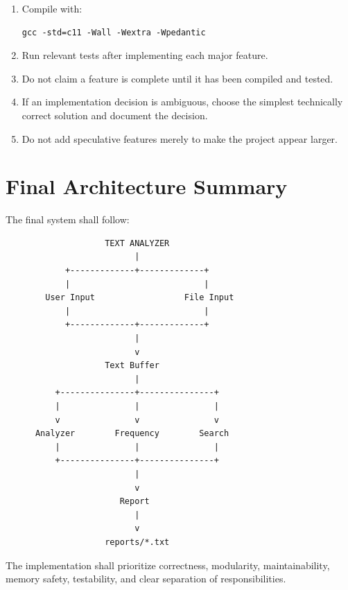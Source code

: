 \documentclass[12pt,a4paper]{article}
\begin{document}
\begin{enumerate}
    \item Compile with:
    
\begin{verbatim}
gcc -std=c11 -Wall -Wextra -Wpedantic
\end{verbatim}

    \item Run relevant tests after implementing each major feature.

    \item Do not claim a feature is complete until it has been
    compiled and tested.

    \item If an implementation decision is ambiguous, choose the
    simplest technically correct solution and document the decision.

    \item Do not add speculative features merely to make the project
    appear larger.

\end{enumerate}


\section{Final Architecture Summary}

The final system shall follow:

\begin{verbatim}
                    TEXT ANALYZER
                          |
            +-------------+-------------+
            |                           |
        User Input                  File Input
            |                           |
            +-------------+-------------+
                          |
                          v
                    Text Buffer
                          |
          +---------------+---------------+
          |               |               |
          v               v               v
      Analyzer        Frequency        Search
          |               |               |
          +---------------+---------------+
                          |
                          v
                       Report
                          |
                          v
                    reports/*.txt
\end{verbatim}

The implementation shall prioritize correctness, modularity,
maintainability, memory safety, testability, and clear separation of
responsibilities.
\end{document}
